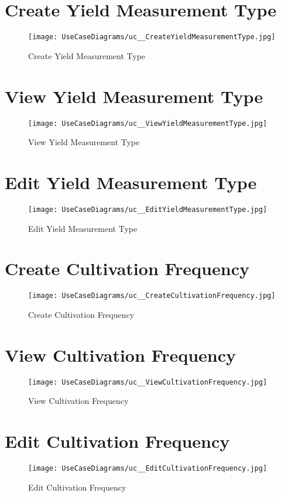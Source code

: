 \documentclass[11pt,fleqn]{book} %
\begin{document}
	\section{Create Yield Measurement Type}
	\begin{figure}
		\texttt{[image: UseCaseDiagrams/uc\_\_CreateYieldMeasurementType.jpg]}
		\caption{Create Yield Measurement Type}
	\end{figure}
	
	\section{View Yield Measurement Type}
	\begin{figure}
		\texttt{[image: UseCaseDiagrams/uc\_\_ViewYieldMeasurementType.jpg]}
		\caption{View Yield Measurement Type}
	\end{figure}
	
	\section{Edit Yield Measurement Type}
	\begin{figure}
		\texttt{[image: UseCaseDiagrams/uc\_\_EditYieldMeasurementType.jpg]}
		\caption{Edit Yield Measurement Type}
	\end{figure}
	
	\section{Create Cultivation Frequency}
	\begin{figure}
		\texttt{[image: UseCaseDiagrams/uc\_\_CreateCultivationFrequency.jpg]}
		\caption{Create Cultivation Frequency}
	\end{figure}
	
	\section{View Cultivation Frequency}
	\begin{figure}
		\texttt{[image: UseCaseDiagrams/uc\_\_ViewCultivationFrequency.jpg]}
		\caption{View Cultivation Frequency}
	\end{figure}
	
	\section{Edit Cultivation Frequency}
	\begin{figure}
		\texttt{[image: UseCaseDiagrams/uc\_\_EditCultivationFrequency.jpg]}
		\caption{Edit Cultivation Frequency}
	\end{figure}
	
\end{document}
